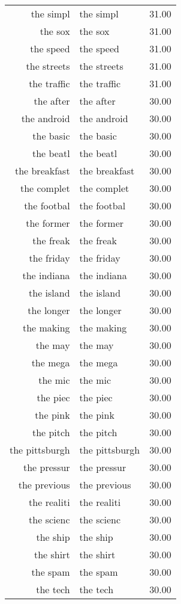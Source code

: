 \begin{table}[ht]
\begin{tabular}{rlr}
  the simpl & the simpl & 31.00 \\ 
  the sox & the sox & 31.00 \\ 
  the speed & the speed & 31.00 \\ 
  the streets & the streets & 31.00 \\ 
  the traffic & the traffic & 31.00 \\ 
  the after & the after & 30.00 \\ 
  the android & the android & 30.00 \\ 
  the basic & the basic & 30.00 \\ 
  the beatl & the beatl & 30.00 \\ 
  the breakfast & the breakfast & 30.00 \\ 
  the complet & the complet & 30.00 \\ 
  the footbal & the footbal & 30.00 \\ 
  the former & the former & 30.00 \\ 
  the freak & the freak & 30.00 \\ 
  the friday & the friday & 30.00 \\ 
  the indiana & the indiana & 30.00 \\ 
  the island & the island & 30.00 \\ 
  the longer & the longer & 30.00 \\ 
  the making & the making & 30.00 \\ 
  the may & the may & 30.00 \\ 
  the mega & the mega & 30.00 \\ 
  the mic & the mic & 30.00 \\ 
  the piec & the piec & 30.00 \\ 
  the pink & the pink & 30.00 \\ 
  the pitch & the pitch & 30.00 \\ 
  the pittsburgh & the pittsburgh & 30.00 \\ 
  the pressur & the pressur & 30.00 \\ 
  the previous & the previous & 30.00 \\ 
  the realiti & the realiti & 30.00 \\ 
  the scienc & the scienc & 30.00 \\ 
  the ship & the ship & 30.00 \\ 
  the shirt & the shirt & 30.00 \\ 
  the spam & the spam & 30.00 \\ 
  the tech & the tech & 30.00 \\ 

\end{tabular}
\end{table}
